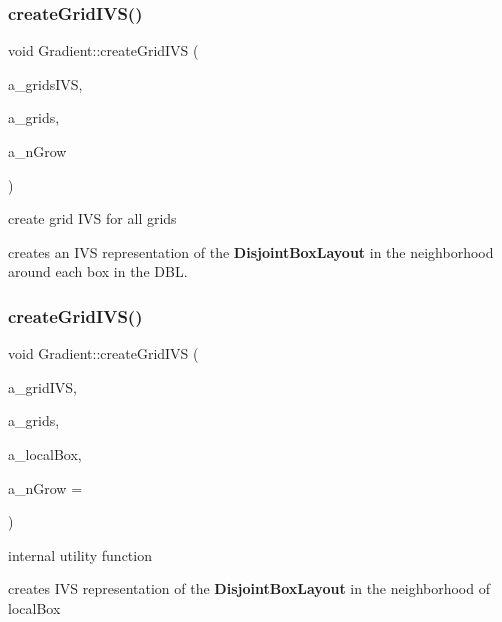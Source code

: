 \subsubsection{\texorpdfstring{create\+Grid\+I\+V\+S()}{createGridIVS()}\hspace{0.1cm}{\footnotesize\ttfamily [1/2]}}
{\footnotesize\ttfamily void Gradient\+::create\+Grid\+I\+VS (\begin{DoxyParamCaption}\item[{\textbf{ Layout\+Data}$<$ \textbf{ Int\+Vect\+Set} $>$ \&}]{a\+\_\+grids\+I\+VS,  }\item[{const \textbf{ Disjoint\+Box\+Layout} \&}]{a\+\_\+grids,  }\item[{const int}]{a\+\_\+n\+Grow }\end{DoxyParamCaption})\hspace{0.3cm}{\ttfamily [static]}}



create grid I\+VS for all grids 

creates an I\+VS representation of the \textbf{ Disjoint\+Box\+Layout} in the neighborhood around each box in the D\+BL. \mbox{\label{class_gradient_ab8d450f2f5e455e2a33ef3a33b2f5a98}} 
\subsubsection{\texorpdfstring{create\+Grid\+I\+V\+S()}{createGridIVS()}\hspace{0.1cm}{\footnotesize\ttfamily [2/2]}}
{\footnotesize\ttfamily void Gradient\+::create\+Grid\+I\+VS (\begin{DoxyParamCaption}\item[{\textbf{ Int\+Vect\+Set} \&}]{a\+\_\+grid\+I\+VS,  }\item[{const \textbf{ Disjoint\+Box\+Layout} \&}]{a\+\_\+grids,  }\item[{const \textbf{ Box} \&}]{a\+\_\+local\+Box,  }\item[{const int}]{a\+\_\+n\+Grow = {} }\end{DoxyParamCaption})\hspace{0.3cm}{\ttfamily [static]}}



internal utility function 

creates I\+VS representation of the \textbf{ Disjoint\+Box\+Layout} in the neighborhood of local\+Box \mbox{\label{class_gradient_aa657ff462b1dd44565ab4e5c35c097fa}} 
